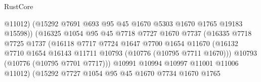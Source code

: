 \begin{lexlean}{RustCore}
\begin{coremodule}
                                        @11012)
                                      (@15292
                                        @7691
                                        @693
                                        @95
                                        @45
                                        @1670
                                        @5303
                                        @1670
                                        @1765
                                        @19183
                                        @15598))
                                    (@16325
                                      @1054
                                      @95
                                      @45
                                      @7718
                                      @7727
                                      @1670
                                      @7737
                                      (@16335
                                        @7718
                                        @7725
                                        @1737
                                        (@16118
                                          @7717
                                          @7724
                                          @1647
                                          @7700
                                          @1654
                                          @11670
                                          (@16132
                                            @7710
                                            @1654
                                            @16143
                                            @11711
                                            @10793
                                            (@10776 (@10795 @7711 @1670)))
                                          @10793
                                          (@10776 (@10795 @7701 @7717)))
                                        @10991
                                        @10994
                                        @10997
                                        @11001
                                        @11006
                                        @11012)
                                      (@15292
                                        @7727
                                        @1054
                                        @95
                                        @45
                                        @1670
                                        @7734
                                        @1670
                                        @1765

\end{coremodule}
\end{lexlean}
